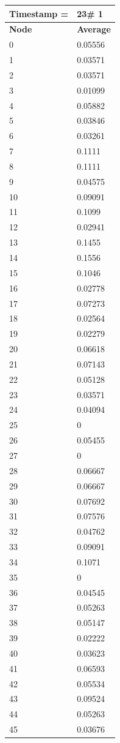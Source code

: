 \begin{tabular}{|l||l|}
\hline
\textbf{Timestamp =} & \textbf{23}\# 1\\\hline
	\textbf{Node} & \textbf{Average} \\ \hline
\hline
	0 & 0.05556 \\ \hline
	1 & 0.03571 \\ \hline
	2 & 0.03571 \\ \hline
	3 & 0.01099 \\ \hline
	4 & 0.05882 \\ \hline
	5 & 0.03846 \\ \hline
	6 & 0.03261 \\ \hline
	7 & 0.1111 \\ \hline
	8 & 0.1111 \\ \hline
	9 & 0.04575 \\ \hline
	10 & 0.09091 \\ \hline
	11 & 0.1099 \\ \hline
	12 & 0.02941 \\ \hline
	13 & 0.1455 \\ \hline
	14 & 0.1556 \\ \hline
	15 & 0.1046 \\ \hline
	16 & 0.02778 \\ \hline
	17 & 0.07273 \\ \hline
	18 & 0.02564 \\ \hline
	19 & 0.02279 \\ \hline
	20 & 0.06618 \\ \hline
	21 & 0.07143 \\ \hline
	22 & 0.05128 \\ \hline
	23 & 0.03571 \\ \hline
	24 & 0.04094 \\ \hline
	25 & 0 \\ \hline
	26 & 0.05455 \\ \hline
	27 & 0 \\ \hline
	28 & 0.06667 \\ \hline
	29 & 0.06667 \\ \hline
	30 & 0.07692 \\ \hline
	31 & 0.07576 \\ \hline
	32 & 0.04762 \\ \hline
	33 & 0.09091 \\ \hline
	34 & 0.1071 \\ \hline
	35 & 0 \\ \hline
	36 & 0.04545 \\ \hline
	37 & 0.05263 \\ \hline
	38 & 0.05147 \\ \hline
	39 & 0.02222 \\ \hline
	40 & 0.03623 \\ \hline
	41 & 0.06593 \\ \hline
	42 & 0.05534 \\ \hline
	43 & 0.09524 \\ \hline
	44 & 0.05263 \\ \hline
	45 & 0.03676 \\ \hline
\end{tabular}
